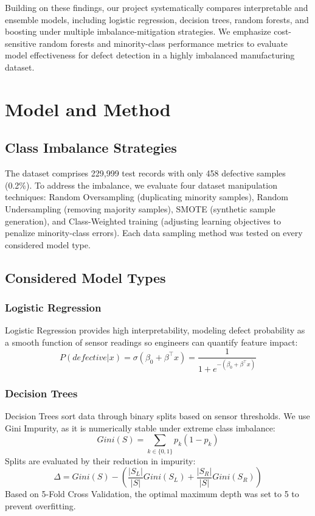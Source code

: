 \documentclass{article}
\begin{document}
Building on these findings, our project systematically compares interpretable and ensemble models, including logistic regression, decision trees, random forests, and boosting under multiple imbalance-mitigation strategies. We emphasize cost-sensitive random forests and minority-class performance metrics to evaluate model effectiveness for defect detection in a highly imbalanced manufacturing dataset.



\section{Model and Method}

\subsection{Class Imbalance Strategies}
The dataset comprises 229,999 test records with only 458 defective samples (0.2\%). To address the imbalance, we evaluate four dataset manipulation techniques: Random Oversampling (duplicating minority samples), Random Undersampling (removing majority samples), SMOTE (synthetic sample generation), and Class-Weighted training (adjusting learning objectives to penalize minority-class errors). Each data sampling method was tested on every considered model type.
 

\subsection{Considered Model Types}
\subsubsection*{Logistic Regression}
Logistic Regression provides high interpretability, modeling defect probability as a smooth function of sensor readings so engineers can quantify feature impact:
\begin{equation}
P(defective|x) = \sigma(\beta_{0} + \beta^{\top}x) = \frac{1}{1 + e^{-(\beta_{0} + \beta^{\top}x)}}
\end{equation}
\subsubsection*{Decision Trees}
Decision Trees sort data through binary splits based on sensor thresholds. We use Gini Impurity, as it is numerically stable under extreme class imbalance:
\begin{equation}
Gini(S) = \sum_{k \in \{0,1\}} p_{k}(1 - p_{k})
\end{equation}
Splits are evaluated by their reduction in impurity:
\begin{equation}
\Delta = Gini(S) - \left(\frac{|S_{L}|}{|S|}Gini(S_{L}) + \frac{|S_{R}|}{|S|}Gini(S_{R})\right)
\end{equation}
Based on 5-Fold Cross Validation, the optimal maximum depth was set to 5 to prevent overfitting.
 
\end{document}
